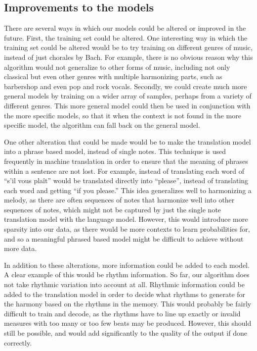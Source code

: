 \documentclass{sig-alternate}
\begin{document}
\subsection{Improvements to the models}
There are several ways in which our models could be altered or improved in the future. First, the training set could be altered. One interesting way in which the training set could be altered would be to try training on different genres of music, instead of just chorales by Bach. For example, there is no obvious reason why this algorithm would not generalize to other forms of music, including not only classical but even other genres with multiple harmonizing parts, such as barbershop and even pop and rock vocals. Secondly, we could create much more general models by training on a wider array of samples, perhaps from a variety of different genres. This more general model could then be used in conjunction with the more specific models, so that it when the context is not found in the more specific model, the algorithm can fall back on the general model.

One other alteration that could be made would be to make the translation model into a phrase based model, instead of single notes. This technique is used frequently in machine translation in order to ensure that the meaning of phrases within a sentence are not lost. For example, instead of translating each word of ``s'il vous pla\^{i}t'' would be translated directly into ``please'', instead of translating each word and getting ``if you please.'' This idea generalizes well to harmonizing a melody, as there are often sequences of notes that harmonize well into other sequences of notes, which might not be captured by just the single note translation model with the language model. However, this would introduce more sparsity into our data, as there would be more contexts to learn probabilities for, and so a meaningful phrased based model might be difficult to achieve without more data.

In addition to these alterations, more information could be added to each model. A clear example of this would be rhythm information. So far, our algorithm does not take rhythmic variation into account at all. Rhythmic information could be added to the translation model in order to decide what rhythms to generate for the harmony based on the rhythms in the memory. This would probably be fairly difficult to train and decode, as the rhythms have to line up exactly or invalid measures with too many or too few beats may be produced. However, this should still be possible, and would add significantly to the quality of the output if done correctly.
\label{sec:remaining_work}



\label{app}
\end{document}
